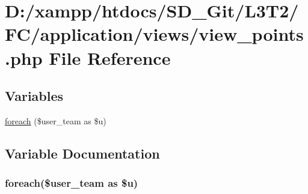 \hypertarget{view__points_8php}{}\section{D\+:/xampp/htdocs/\+S\+D\+\_\+\+Git/\+L3\+T2/\+F\+C/application/views/view\+\_\+points.php File Reference}
\label{view__points_8php}
\subsection*{Variables}
\begin{DoxyCompactItemize}
\item 
\hyperlink{view__points_8php_a7ad0caecb10918b48851bd7908ec97c5}{foreach} (\$user\+\_\+team as \$u)
\end{DoxyCompactItemize}


\subsection{Variable Documentation}
\hypertarget{view__points_8php_a7ad0caecb10918b48851bd7908ec97c5}{}
\subsubsection[{foreach}]{\setlength{\rightskip}{0pt plus 5cm}foreach(\$user\+\_\+team as \$u)}\label{view__points_8php_a7ad0caecb10918b48851bd7908ec97c5}
